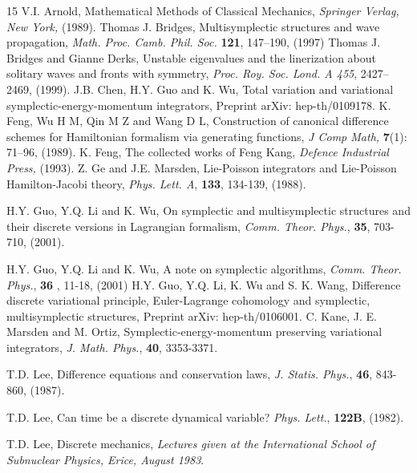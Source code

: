 \documentclass[a4paper,a4paper]{article}
\begin{document}
\begin{thebibliography} {15}
\label{a1} V.I. Arnold, Mathematical Methods of Classical Mechanics,
      {\em Springer Verlag, New York,} (1989).
\label{b1}  Thomas J. Bridges, Multisymplectic structures and wave
              propagation,
              {\em Math. Proc. Camb. Phil. Soc.}  {\bf 121}, 147--190, (1997)
\label{b2}  Thomas J. Bridges and Gianne Derks,  Unstable eigenvalues and
             the linerization
     about solitary waves and fronts with symmetry, {\em Proc. Roy. Soc. Lond. A
            455},  2427--2469, (1999).
\label{c1}
    J.B. Chen, H.Y. Guo and K. Wu, Total variation and variational
    symplectic-energy-momentum integrators, Preprint arXiv: hep-th/0109178.
\label{f1} K. Feng, Wu H M, Qin M Z and Wang D L, Construction of canonical difference
             schemes for Hamiltonian formalism via generating functions,
             {\em J Comp Math,}  {\bf 7}(1): 71--96, (1989).
\label{f2}K. Feng, The collected works of Feng Kang, {\em Defence
Industrial Press, } (1993).
\label{g1}
Z. Ge and J.E. Marsden, Lie-Poisson integrators and Lie-Poisson Hamilton-Jacobi
theory, {\em Phys. Lett. A}, {\bf 133}, 134-139, (1988).

\label{glw}
H.Y. Guo, Y.Q. Li and K. Wu, On symplectic and multisymplectic
structures and their discrete versions in Lagrangian formalism,
{\em Comm. Theor. Phys.}, {\bf 35}, 703-710, (2001).

\label{guo1}
H.Y. Guo, Y.Q. Li and K. Wu, A note on symplectic algorithms, {\em Comm. Theor. Phys.},
{\bf 36 }, 11-18, (2001)
\label{guo2}
H.Y. Guo, Y.Q. Li, K. Wu and S. K. Wang, Difference discrete variational principle,
Euler-Lagrange cohomology and symplectic, multisymplectic structures, Preprint
arXiv: hep-th/0106001.
\label{k1}
C. Kane, J. E. Marsden and M. Ortiz,  Symplectic-energy-momentum preserving
variational integrators, {\em J. Math. Phys.}, {\bf 40}, 3353-3371.

\label{l1}
T.D. Lee, Difference equations and conservation laws, {\em J. Statis. Phys.},
{\bf 46}, 843-860, (1987).

\label{l2}
T.D. Lee, Can time be a discrete dynamical variable? {\em Phys. Lett.}, {\bf
122B}, (1982).

\label{l3}
T.D. Lee, Discrete mechanics, {\em Lectures given at the International School
of Subnuclear Physics, Erice, August 1983}.


\end{thebibliography}
\end{document}
